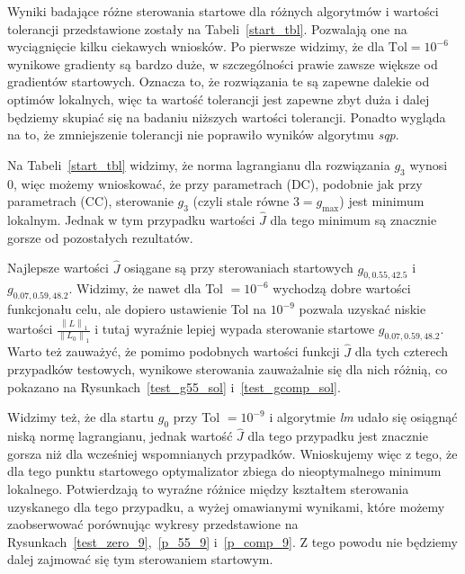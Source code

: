 \documentclass[licencjacka]{pracamgr}
\newcommand{\norm}[1]{\left\lVert#1\right\rVert}
\begin{document}
Wyniki badające różne sterowania startowe dla różnych algorytmów i wartości tolerancji przedstawione zostały na Tabeli~\ref{start_tbl}. Pozwalają one na wyciągnięcie kilku ciekawych wniosków. Po pierwsze widzimy, że dla $\text{Tol} = 10^{-6}$ wynikowe gradienty są bardzo duże, w szczególności prawie zawsze większe od gradientów startowych. Oznacza to, że rozwiązania te są zapewne dalekie od optimów lokalnych, więc ta wartość tolerancji jest zapewne zbyt duża i dalej będziemy skupiać się na badaniu niższych wartości tolerancji. Ponadto wygląda na to, że zmniejszenie tolerancji nie poprawiło wyników algorytmu {\it sqp}.

Na Tabeli~\ref{start_tbl} widzimy, że norma lagrangianu dla rozwiązania $g_3$ wynosi 0, więc możemy wnioskować, że przy parametrach (DC), podobnie jak przy parametrach (CC), sterowanie $g_3$ (czyli stale równe $3 = g_{\max}$) jest minimum lokalnym. Jednak w tym przypadku wartości $\hat{J}$ dla tego minimum są znacznie gorsze od pozostałych rezultatów. 

Najlepsze wartości $\hat{J}$ osiągane są przy sterowaniach startowych $g_{0,0.55,42.5}$ i $g_{0.07,0.59,48.2}$. Widzimy, że nawet dla Tol $= 10^{-6}$ wychodzą dobre wartości funkcjonału celu, ale dopiero ustawienie Tol na $10^{-9}$ pozwala uzyskać niskie wartości $\frac{\norm{L}_1}{\norm{L_0}_1}$ i tutaj wyraźnie lepiej wypada sterowanie startowe $g_{0.07,0.59,48.2}$. Warto też zauważyć, że pomimo podobnych wartości funkcji $\hat{J}$ dla tych czterech przypadków testowych, wynikowe sterowania zauważalnie się dla nich różnią, co pokazano na Rysunkach~\ref{test_g55_sol} i~\ref{test_gcomp_sol}.

Widzimy też, że dla startu $g_0$ przy Tol $= 10^{-9}$ i algorytmie {\it lm\/} udało się osiągnąć niską normę lagrangianu, jednak wartość $\hat{J}$ dla tego przypadku jest znacznie gorsza niż dla wcześniej wspomnianych przypadków. Wnioskujemy więc z tego, że dla tego punktu startowego optymalizator zbiega do nieoptymalnego minimum lokalnego. Potwierdzają to wyraźne różnice między kształtem sterowania uzyskanego dla tego przypadku, a wyżej omawianymi wynikami, które możemy zaobserwować porównując wykresy przedstawione na Rysunkach~\ref{test_zero_9},~\ref{p_55_9} i~\ref{p_comp_9}. Z tego powodu nie będziemy dalej zajmować się tym sterowaniem startowym.
\end{document}
